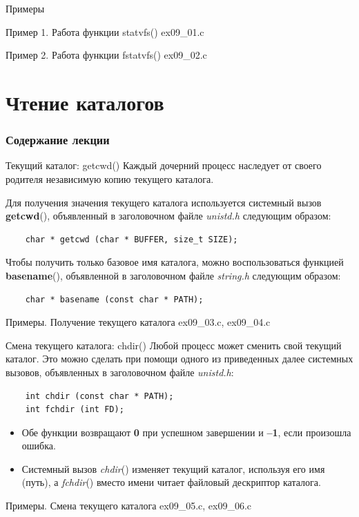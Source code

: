 \documentclass[xcolor=table]{beamer}
\begin{document}
\begin{frame}[fragile]{Примеры}
\begin{block}{Пример 1. Работа функции statvfs()}
ex09\_01.c
\end{block}
\begin{block}{Пример 2. Работа функции fstatvfs()}
ex09\_02.c
\end{block}
\end{frame}

\section{Чтение каталогов}
\begin{frame}
  \frametitle{Содержание лекции}
  \tableofcontents[current]
\end{frame}

\begin{frame}[fragile]{Текущий каталог: getcwd()}
	Каждый дочерний процесс наследует от своего родителя независимую копию текущего каталога.

	Для получения значения текущего каталога используется системный вызов \textbf{getcwd}(), объявленный в заголовочном файле \textit{unistd.h} следующим образом:
	\begin{verbatim}
	char * getcwd (char * BUFFER, size_t SIZE);
	\end{verbatim}
	Чтобы получить только базовое имя каталога, можно воспользоваться функцией \textbf{basename}(), объявленной в заголовочном файле \textit{string.h} следующим образом:
	\begin{verbatim}
	char * basename (const char * PATH);
	\end{verbatim}
	\begin{block}{Примеры. Получение текущего каталога}
		ex09\_03.c, ex09\_04.c
	\end{block}
\end{frame}

\begin{frame}[fragile]{Смена текущего каталога: chdir()}
	Любой процесс может сменить свой текущий каталог. Это можно сделать при помощи одного из приведенных далее системных вызовов, объявленных в заголовочном файле \textit{unistd.h}:
	\begin{verbatim}
	int chdir (const char * PATH);
	int fchdir (int FD);
	\end{verbatim}
	\begin{itemize}
		\item Обе функции возвращают \textbf{0} при успешном завершении и \textbf{–1}, если произошла ошибка. 
		\item Системный вызов \textit{chdir}() изменяет текущий каталог, используя его имя (путь), а \textit{fchdir}() вместо имени читает файловый дескриптор каталога.
	\end{itemize}
	\begin{block}{Примеры. Смена текущего каталога}
		ex09\_05.c, ex09\_06.c
	\end{block}
\end{frame}
\end{document}
